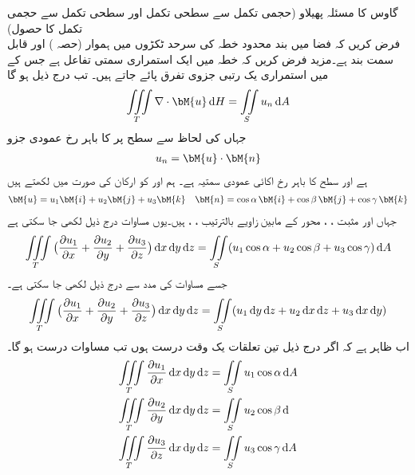 \quad گاوس کا مسئلہ پھیلاو (حجمی تکمل سے سطحی تکمل اور سطحی تکمل سے حجمی تکمل کا حصول)\\
فرض کریں کہ فضا میں بند محدود خطہ  کی سرحد  ٹکڑوں میں ہموار (حصہ ) اور قابل سمت بند ہے۔مزید فرض کریں کہ خطہ  میں  ایک استمراری سمتی تفاعل ہے جس کے  میں استمراری یک رتبی جزوی تفرق پائے جاتے ہیں۔ تب درج ذیل ہو گا
\begin{align}\label{مساوات_خطی_تکمل_مسئلہ_گاوس_الف}
\iiint\limits_T \nabla \cdot \bM{u}\dif H=\iint\limits_S u_n\dif A
\end{align}
جہاں  کی لحاظ سے سطح  پر  کا باہر رخ عمودی جزو
\begin{align}\label{مساوات_خطی_تکمل_مسئلہ_گاوس_ب}
u_n=\bM{u}\cdot \bM{n}
\end{align}
ہے اور  سطح  کا باہر رخ  اکائی عمودی سمتیہ ہے۔
ہم  اور  کو ارکان کی صورت میں لکھتے ہیں
\begin{align*}
\bM{u}=u_1\bM{i}+u_2\bM{j}+u_3\bM{k} \quad \bM{n}=\cos \alpha \,\bM{i}+\cos \beta \,\bM{j}+\cos \gamma\,\bM{k} 
\end{align*}
جہاں  اور مثبت ، ،  محور کے مابین زاویے بالترتیب ، ،  ہیں۔یوں مساوات  درج ذیل لکھی جا سکتی ہے
\begin{align}\label{مساوات_خطی_تکمل_مسئلہ_گاوس_پ}
\iiint\limits_T \big(\frac{\partial u_1}{\partial x}+\frac{\partial u_2}{\partial y}+\frac{\partial u_3}{\partial z}\big)\dif x\dif y\dif z=\iint\limits_S (u_1\cos \alpha+u_2\cos \beta+u_3\cos \gamma)\dif A
\end{align}
جسے مساوات  کی مدد سے درج ذیل لکھی جا سکتی ہے۔
\begin{align}\label{مساوات_خطی_تکمل_مسئلہ_گاوس_ت}
\iiint\limits_T \big(\frac{\partial u_1}{\partial x}+\frac{\partial u_2}{\partial y}+\frac{\partial u_3}{\partial z}\big)\dif x\dif y\dif z=\iint\limits_S (u_1\dif y\dif z+u_2\dif x\dif z +u_3\dif x\dif y)
\end{align}
اب ظاہر ہے کہ اگر درج ذیل تین تعلقات یک وقت درست ہوں تب مساوات  درست ہو گا۔
\begin{align}
\iiint\limits_T \frac{\partial u_1}{\partial x}\dif x\dif y\dif z&=\iint\limits_S u_1\cos \alpha \dif A \label{مساوات_خطی_تکمل_مسئلہ_گاوس_ٹ}\\
\iiint\limits_T \frac{\partial u_2}{\partial y}\dif x\dif y\dif z&=\iint\limits_S u_2\cos \beta \dif \label{مساوات_خطی_تکمل_مسئلہ_گاوس_ث}\\
\iiint\limits_T \frac{\partial u_3}{\partial z}\dif x\dif y\dif z&=\iint\limits_S u_3\cos \gamma \dif A\label{مساوات_خطی_تکمل_مسئلہ_گاوس_ج}
\end{align}

